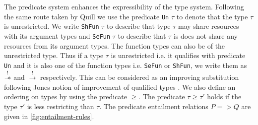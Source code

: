 The predicate system enhances the expressibility of the type system. Following the same route taken
by Quill \citep{morris_best_2016} we use the predicate \texttt{Un} $\tau$ to denote
that the type $\tau$ is unrestricted. We write \texttt{ShFun} $\tau$ to describe that type $\tau$ may share resources with its
argument types and \texttt{SeFun} $\tau$ to describe that $\tau$ is
does not share any resources from its argument types. The function types can also be of the unrestricted type.
Thus if a type $\tau$ is unrestricted i.e. it qualifies with predicate \texttt{Un} and it is also one of the function types
i.e. \texttt{SeFun} or \texttt{ShFun}, we write them as $\overset{!}{\mathrel{-\mkern-6mu*}}$ and $\xrightarrow{!}$ respectively.
This can be considered as an improving substitution following Jones notion of improvement of qualified types \citep{jones_simplifying_1995}.
We also define an ordering on types by using the predicate $\geq$. The predicate $\tau \geq \tau'$ holds if the type $\tau'$
is less restricting than $\tau$. The predicate entailment relations $P => Q$ are given in \cref{fig:entailment-rules}.
